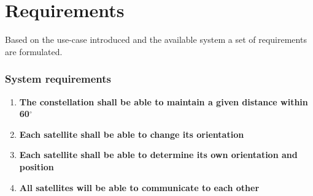 \chapter{Requirements}\label{chap:requirements}
Based on the use-case introduced and the available system a set of requirements are formulated.
%
\subsection*{System requirements}
%
\begin{enumerate}
	\item \textbf{The constellation shall be able to maintain a given distance within 60$^{\circ}$} 
		\item \textbf{Each satellite shall be able to change its orientation}
		\item \textbf{Each satellite shall be able to determine its own orientation and position}		\item \textbf{All satellites will be able to communicate to each other}
\end{enumerate}

